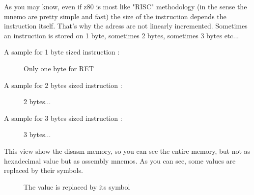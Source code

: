 \documentclass[10pt]{report}
\begin{document}
As you may know, even if z80 is most like "RISC" methodology (in the sense the mnemo are pretty simple and fast) the size of the instruction depends the instruction itself.\newline
That's why the adress are not linearly incremented.\newline
Sometimes an instruction is stored on 1 byte, sometimes 2 bytes, sometimes 3 bytes etc...\newline

A sample for 1 byte sized instruction :\newline
\begin{figure}[H]
\centering
{}
\caption{Only one byte for RET}
\end{figure}

A sample for 2 bytes sized instruction :\newline
\begin{figure}[H]
\centering
{}
\caption{2 bytes...}
\end{figure}

A sample for 3 bytes sized instruction :\newline
\begin{figure}[H]
\centering
{}
\caption{3 bytes...}
\end{figure}

This view show the disasm memory, so you can see the entire memory, but not as hexadecimal value but as assembly mnemos.\newline
As you can see, some values are replaced by their symbols.
\begin{figure}[H]
\centering
{}
\caption{The value is replaced by its symbol}
\end{figure}
\end{document}

